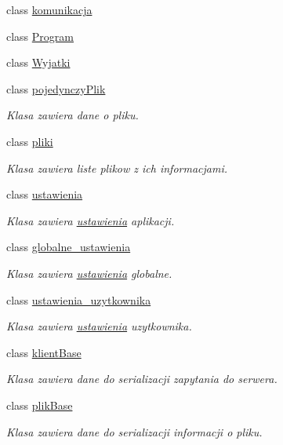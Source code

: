 \begin{CompactItemize}
class \hyperlink{a00013}{komunikacja}
\item 
class \hyperlink{a00021}{Program}
\item 
class \hyperlink{a00030}{Wyjatki}
\item 
class \hyperlink{a00020}{pojedynczyPlik}
\begin{CompactList}\small\item\em Klasa zawiera dane o pliku. \item\end{CompactList}\item 
class \hyperlink{a00017}{pliki}
\begin{CompactList}\small\item\em Klasa zawiera liste plikow z ich informacjami. \item\end{CompactList}\item 
class \hyperlink{a00028}{ustawienia}
\begin{CompactList}\small\item\em Klasa zawiera \hyperlink{a00028}{ustawienia} aplikacji. \item\end{CompactList}\item 
class \hyperlink{a00006}{globalne\_\-ustawienia}
\begin{CompactList}\small\item\em Klasa zawiera \hyperlink{a00028}{ustawienia} globalne. \item\end{CompactList}\item 
class \hyperlink{a00029}{ustawienia\_\-uzytkownika}
\begin{CompactList}\small\item\em Klasa zawiera \hyperlink{a00028}{ustawienia} uzytkownika. \item\end{CompactList}\item 
class \hyperlink{a00007}{klientBase}
\begin{CompactList}\small\item\em Klasa zawiera dane do serializacji zapytania do serwera. \item\end{CompactList}\item 
class \hyperlink{a00016}{plikBase}
\begin{CompactList}\small\item\em Klasa zawiera dane do serializacji informacji o pliku. \item\end{CompactList}\item 

\end{CompactItemize}
